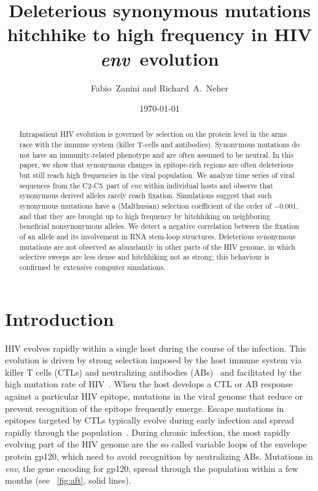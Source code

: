 \documentclass[rmp, twocolumn]{revtex4}
\newcommand{\env}{\textit{env}}
\newcommand{\shankaregion}{C2-C5}
\newcommand{\Author}{Fabio~Zanini and Richard~A.~Neher}
\newcommand{\Title}{Deleterious synonymous mutations hitchhike to high frequency in HIV \env~evolution}
\begin{document}
\title{\Title}
\author{\Author}
\date{\today}

\begin{abstract}
\noindent
Intrapatient HIV evolution is governed by selection on the protein level in the
arms race with the immune system (killer T-cells and antibodies). Synonymous
mutations do not have an immunity-related phenotype and are often assumed to be
neutral. In this paper, we show that synonymous changes in epitope-rich regions
are often deleterious but still reach high frequencies in the viral population.  We analyze time
series of viral sequences from the \shankaregion~part of {\it env} within individual
hosts and observe that synonymous derived alleles rarely reach fixation.
Simulations suggest that such synonymous mutations
have a (Malthusian) selection coefficient of the order of $-0.001$, and that
they are brought up to high frequency by hitchhiking on neighboring beneficial
nonsynonymous alleles. We detect a negative correlation between the fixation of an allele and
its involvement in RNA stem-loop structures.
Deleterious synonymous mutations are not observed as abundantly in other parts of the HIV genome, in which
selective sweeps are less dense and hitchhiking not as strong; this behaviour is
confirmed by extensive computer simulations.

\end{abstract}
\maketitle

\section{Introduction}

HIV evolves rapidly within a single host during the course of the infection.
This evolution is driven by strong selection imposed by the host immune system
via killer T cells (CTLs) and neutralizing antibodies
(ABs)~\citep{rambaut_causes_2004} and facilitated by the high
mutation rate of HIV~\citep{mansky_lower_1995}. When the host develops a CTL or
AB response against a particular HIV epitope, mutations in the viral genome that
reduce or prevent recognition of the epitope frequently emerge. Escape mutations
in epitopes targeted by CTLs typically evolve during early infection and spread
rapidly through the population~\citep{mcmichael_immune_2009}. During chronic
infection, the most rapidly evolving part of the HIV genome are the so called
variable loops of the envelope protein gp120, which need to avoid recognition by
neutralizing ABs.  Mutations in \env, the gene encoding for gp120, spread
through the population within a few months (see \figurename~\ref{fig:aft}, solid
lines).  
\end{document}
